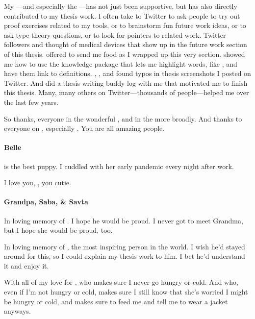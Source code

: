 My ---and especially the ---has not just been supportive,
but has also directly contributed to my thesis work.
I often take to Twitter to ask people to try out proof exercises related to my tools,
or to brainstorm fun future work ideas,
or to ask type theory questions,
or to look for pointers to related work.
Twitter followers  and  thought of medical devices
that show up in the future work section of this thesis.
 offered to send me food as I wrapped up this very section.
 showed me how to use the knowledge package that lets
me highlight words, like , and have them link to definitions.
, , and  found typos in thesis screenshots I posted on Twitter.
And  did a thesis writing buddy log with me that motivated me to finish this thesis.
Many, many others on Twitter---thousands of people---helped me over the last few years.

So thanks, everyone in the wonderful , and in the  more broadly.
And thanks to everyone on , especially .
You are all amazing people.

\paragraph{Belle}

 is the best puppy. I cuddled with her early pandemic every night after work.

I love you, , you cutie.

\paragraph{Grandpa, Saba, \& Savta}

In loving memory of . I hope he would be proud.
I never got to meet Grandma, but I hope she would be proud, too.

In loving memory of , the most inspiring person in the world.
I wish he'd stayed around for this, so I could explain my thesis work to him.
I bet he'd understand it and enjoy it.

With all of my love for , who makes sure I never go hungry or cold.
And who, even if I'm not hungry or cold, makes sure I still know that she's worried I might be hungry or cold,
and makes sure to feed me and tell me to wear a jacket anyways.

